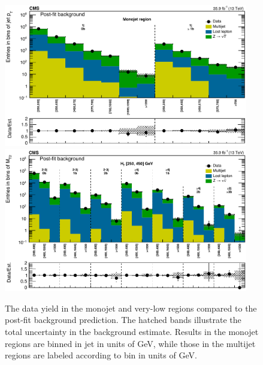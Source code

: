 \begin{figure}
	\centering
	\includegraphics[width=0.95\textwidth]{results/figs/postfit/mt2_monojet_fullEstimate}
	\includegraphics[width=0.95\textwidth]{results/figs/postfit/mt2_veryLowHT_fullEstimate}
	\renewcommand{\baselinestretch}{1.0}
	\caption[The data yield in the monojet and very-low \HT regions compared to the post-fit background prediction.]{The data yield in the monojet and very-low \HT regions compared to the post-fit background prediction. The hatched bands illustrate the total uncertainty in the background estimate. Results in the monojet regions are binned in jet \pt in units of GeV, while those in the multijet regions are labeled according to \mttwo bin in units of GeV.}
	\label{fig:yieldPostfit1}
\end{figure}
